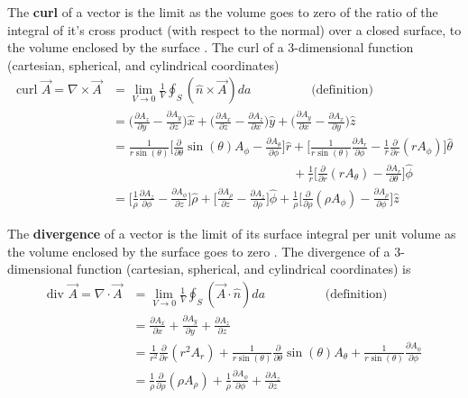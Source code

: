 \begin{defn}{1}
The \textbf{curl} of a vector is the limit as the volume goes to zero of the ratio of the integral of it's cross product (with respect to the normal) over a closed surface, to the volume enclosed by the surface \cite{bib:ReitzEMTheory}. The curl of a 3-dimensional function (cartesian, spherical, and cylindrical coordinates)
\begin{align}
\textrm{curl } \vec{A} = \nabla \times \vec{A} &= \lim\limits_{V\rightarrow 0}\frac{1}{V}\oint_S(\hat{n}\times \vec{A})da\hspace{2cm}\textrm{(definition)} \\
&= \bigg( \frac{\partial A_z}{\partial y} -\frac{\partial A_y}{\partial z}\bigg)\hat{x}+\bigg( \frac{\partial A_x}{\partial z} -\frac{\partial A_z}{\partial x}\bigg)\hat{y}+\bigg( \frac{\partial A_y}{\partial x} -\frac{\partial A_x}{\partial y}\bigg)\hat{z} \\ &= \frac{1}{r\sin(\theta)}\bigg[\frac{\partial}{\partial \theta}\sin(\theta)A_\phi-\frac{\partial A_\theta}{\partial \phi}\bigg]\hat{r}+\bigg[\frac{1}{r\sin(\theta)}\frac{\partial A_r}{\partial \phi}-\frac{1}{r}\frac{\partial}{\partial r}(rA_\phi) \bigg]\hat{\theta} \nonumber \\
& \hspace{6cm}+ \frac{1}{r}\bigg[\frac{\partial}{\partial r}(rA_\theta)-\frac{\partial A_r}{\partial \theta} \bigg]\hat{\phi} \\
&= \bigg[\frac{1}{\rho}\frac{\partial A_z}{\partial \phi}-\frac{\partial A_\phi}{\partial z} \bigg] \hat{\rho} + \bigg[\frac{\partial A_\rho}{\partial z}-\frac{\partial A_z}{\partial \rho}  \bigg]\hat{\phi} + \frac{1}{\rho}\bigg[\frac{\partial}{\partial \rho}(\rho A_\phi)-\frac{\partial A_\rho}{\partial \phi} \bigg]\hat{z} 
\end{align}
\end{defn}

\begin{defn}{1}
The \textbf{divergence} of a vector is the limit of its surface integral per unit volume as the volume enclosed by the surface goes to zero \cite{bib:ReitzEMTheory}. The divergence of a 3-dimensional function (cartesian, spherical, and cylindrical coordinates) is
\begin{align}
\textrm{div }\vec{A}=\nabla \cdot \vec{A} &= \lim\limits_{V\rightarrow 0}\frac{1}{V}\oint_S (\vec{A}\cdot \hat{n}) da \hspace{2cm}\textrm{(definition)} \\ &=\frac{\partial A_x}{\partial x} + \frac{\partial A_y}{\partial y} + \frac{\partial A_z}{\partial z} \\
&= \frac{1}{r^2}\frac{\partial}{\partial r}(r^2A_r)+\frac{1}{r\sin(\theta)}\frac{\partial}{\partial \theta}\sin(\theta)A_\theta+\frac{1}{r\sin(\theta)} \frac{\partial A_\phi}{\partial \phi} \\
&= \frac{1}{\rho}\frac{\partial}{\partial \rho}(\rho A_\rho) + \frac{1}{\rho}\frac{\partial A_\phi}{\partial \phi}+ \frac{\partial A_z}{\partial z}
\end{align}
\end{defn}

